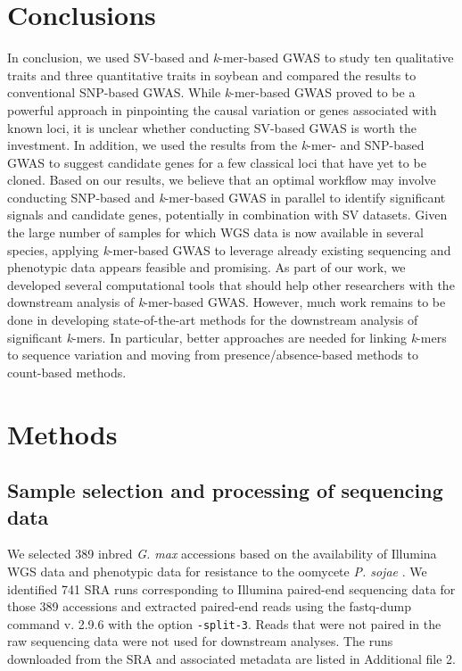 \documentclass[doublespacing]{bmcart}
\begin{document}
\section*{Conclusions}

In conclusion, we used SV-based and \emph{k}-mer-based GWAS to study ten
qualitative traits and three quantitative traits in soybean and
compared the results to conventional SNP-based GWAS. While \emph{k}-mer-based
GWAS proved to be a powerful approach in pinpointing the causal variation or
genes associated with known loci, it is unclear whether conducting SV-based
GWAS is worth the investment. In addition, we used the results from the
\emph{k}-mer- and SNP-based GWAS to suggest candidate genes for a few classical
loci that have yet to be cloned. Based on our results, we believe that an
optimal workflow may involve conducting SNP-based and \emph{k}-mer-based GWAS
in parallel to identify significant signals and candidate genes, potentially in
combination with SV datasets. Given the large number of samples for which WGS
data is now available in several species, applying \emph{k}-mer-based GWAS to
leverage already existing sequencing and phenotypic data appears feasible and
promising.  As part of our work, we developed several computational tools that
should help other researchers with the downstream analysis of
\emph{k}-mer-based GWAS. However, much work remains to be done in
developing state-of-the-art methods for the downstream analysis of significant
\emph{k}-mers. In particular, better approaches are needed for linking
\emph{k}-mers to sequence variation and moving from presence/absence-based
methods to count-based methods.

\section*{Methods}

\subsection*{Sample selection and processing of sequencing data}

We selected 389 inbred \emph{G. max} accessions based on the availability of
Illumina WGS data and phenotypic data for resistance to the oomycete \emph{P.
sojae} \citep{deronne2022}.  We identified 741 SRA runs corresponding to
Illumina paired-end sequencing data for those 389 accessions \citep[data from][]{zhou2015, valliyodan2016, fang2017, bayer2021}
and extracted paired-end reads using the fastq-dump command v. 2.9.6
\cite{sratoolkit} with the
option \texttt{-\-split-3}.
Reads that were not paired in the raw sequencing data were not used
for downstream analyses.  The runs downloaded from the SRA and associated
metadata are listed in Additional file 2.
\end{document}
